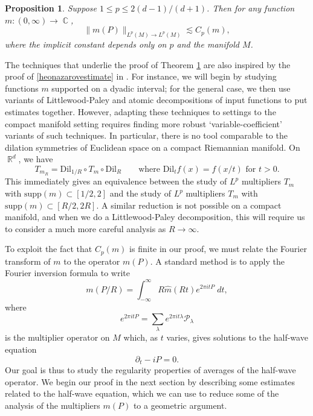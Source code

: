 \documentclass[dvipsnames,letterpaper,12pt]{article}
\DeclareMathOperator{\RR}{\mathbb{R}}
\DeclareMathOperator{\CC}{\mathbb{C}}
\newtheorem{prop}[theorem]{Proposition}
\begin{document}
\begin{prop} \label{mainTheorem}
    Suppose $1 \leq p \leq 2(d-1)/(d+1)$. Then for any function $m: (0,\infty) \to \CC$,
    \[ \| m(P) \|_{L^p(M) \to L^p(M)} \lesssim C_p(m), \]
    where the implicit constant depends only on $p$ and the manifold $M$.
\end{prop}

The techniques that underlie the proof of Theorem \ref{mainTheorem} are also inspired by the proof of \eqref{heonazarovestimate} in \cite{HeoandNazarovandSeeger}. For instance, we will begin by studying functions $m$ supported on a dyadic interval; for the general case, we then use variants of Littlewood-Paley and atomic decompositions of input functions to put estimates together. However, adapting these techniques to settings to the compact manifold setting requires finding more robust `variable-coefficient' variants of such techniques. In particular, there is no tool comparable to the dilation symmetries of Euclidean space on a compact Riemannian manifold. On $\RR^d$, we have
%
\[ T_{m_R} = \text{Dil}_{1/R} \circ T_m \circ \text{Dil}_R\quad\quad \text{where $\text{Dil}_t f(x) = f(x/t)$ for $t > 0$}. \]
%
This immediately gives an equivalence between the study of $L^p$ multipliers $T_m$ with $\text{supp}(m) \subset [1/2,2]$ and the study of $L^p$ multipliers $T_m$ with $\text{supp}(m) \subset [R/2,2R]$. A similar reduction is not possible on a compact manifold, and when we do a Littlewood-Paley decomposition, this will require us to consider a much more careful analysis as $R \to \infty$.

To exploit the fact that $C_p(m)$ is finite in our proof, we must relate the Fourier transform of $m$ to the operator $m(P)$. A standard method is to apply the Fourier inversion formula to write
%
\[ m(P/R) = \int_{-\infty}^\infty R \widehat{m}(Rt) e^{2 \pi i t P}\; dt, \]
%
where
%
\[ e^{2 \pi i t P} = \sum_\lambda e^{2 \pi i t \lambda} \mathcal{P}_\lambda \]
%
is the multiplier operator on $M$ which, as $t$ varies, gives solutions to the half-wave equation
%
\[ \partial_t - i P = 0. \]
%
%
%
%
%
%
%
%
%
%
%
%
%
%
Our goal is thus to study the regularity properties of averages of the half-wave operator. We begin our proof in the next section by describing some estimates related to the half-wave equation, which we can use to reduce some of the analysis of the multipliers $m(P)$ to a geometric argument.
\end{document}
